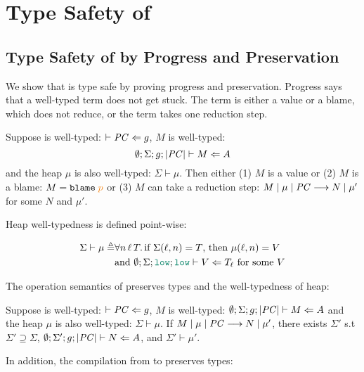 \chapter{Type Safety of \Surface}
\label{ch:type-safety}

\section{Type Safety of \CC by Progress and Preservation}
\label{sec:cc-type-safety}

We show that \CC is type safe by proving progress and preservation. Progress
says that a well-typed \CC term does not get stuck. The term is either a value
or a blame, which does not reduce, or the term takes one reduction step.

\begin{theorem}[Progress]
\label{thm:progress}
Suppose \PC is well-typed: $\vdash \mathit{PC} \Leftarrow g$,
$M$ is well-typed:
\[
\emptyset ; \Sigma ; g ; | \mathit{PC} | \vdash M \Leftarrow A
\]
and the heap $\mu$ is also well-typed: $\Sigma \vdash \mu$.
Then either (1) $M$ is a value or (2) $M$ is a blame: {\normalfont $M = \blame{p}$}
or (3) $M$ can take a reduction step:
${M}\mid{\mu}\mid{\ensuremath{\mathit{PC}}}\longrightarrow{N}\mid{\mu'}$ for some $N$ and $\mu'$.
\end{theorem}

Heap well-typedness is defined point-wise:

\begin{align*}
\Sigma \vdash \mu \triangleq & \forall n\,\ell\,T.\,\text{if}~\Sigma(\ell,n)=T \text{, then}~\mu(\ell,n)=V \\
& \text{and}~\emptyset;\Sigma;\low;\low\vdash V \Leftarrow T_{\ell} ~\text{for some}~ V
\end{align*}

The operation semantics of \CC preserves types and the well-typedness of heap:

\begin{theorem}[Preservation]
\label{thm:preservation}
Suppose \PC is well-typed:  $\vdash \mathit{PC} \Leftarrow g$,
$M$ is well-typed: $\emptyset ; \Sigma ; g ; |\mathit{PC}| \vdash M \Leftarrow A$
and the heap $\mu$ is also well-typed: $\Sigma \vdash \mu$.
If ${M}\mid{\mu}\mid{\ensuremath{\mathit{PC}}}\longrightarrow{N}\mid{\mu'}$, there exists $\Sigma'$ s.t
$\Sigma' \supseteq \Sigma$, $\emptyset ; \Sigma' ; g ; |\mathit{PC}| \vdash N \Leftarrow A$,
and $\Sigma' \vdash \mu'$.
\end{theorem}

In addition, the compilation from \Surface to \CC preserves types:

